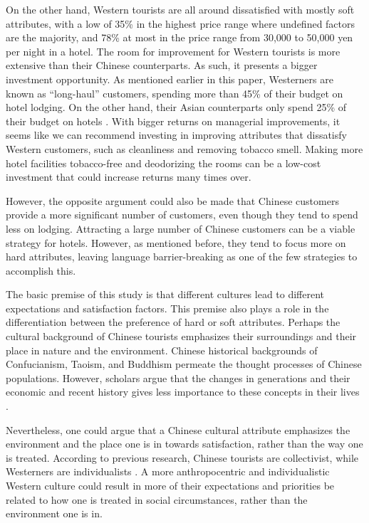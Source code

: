 \documentclass[smallextended,natbib]{svjour3}       %
\begin{document}
    On the other hand, Western tourists are all around dissatisfied with mostly soft attributes, with a low of 35\% in the highest price range where undefined factors are the majority, and 78\% at most in the price range from 30,000 to 50,000 yen per night in a hotel. The room for improvement for Western tourists is more extensive than their Chinese counterparts. As such, it presents a bigger investment opportunity. As mentioned earlier in this paper, Westerners are known as ``long-haul'' customers, spending more than 45\% of their budget on hotel lodging. On the other hand, their Asian counterparts only spend 25\% of their budget on hotels \cite[][]{choi2000}. With bigger returns on managerial improvements, it seems like we can recommend investing in improving attributes that dissatisfy Western customers, such as cleanliness and removing tobacco smell. Making more hotel facilities tobacco-free and deodorizing the rooms can be a low-cost investment that could increase returns many times over.

    However, the opposite argument could also be made that Chinese customers provide a more significant number of customers, even though they tend to spend less on lodging. Attracting a large number of Chinese customers can be a viable strategy for hotels. However, as mentioned before, they tend to focus more on hard attributes, leaving language barrier-breaking as one of the few strategies to accomplish this.

    The basic premise of this study is that different cultures lead to different expectations and satisfaction factors. This premise also plays a role in the differentiation between the preference of hard or soft attributes. Perhaps the cultural background of Chinese tourists emphasizes their surroundings and their place in nature and the environment. Chinese historical backgrounds of Confucianism, Taoism, and Buddhism permeate the thought processes of Chinese populations. However, scholars argue that the changes in generations and their economic and recent history gives less importance to these concepts in their lives \cite[][]{gao2017chinese}.

    Nevertheless, one could argue that a Chinese cultural attribute emphasizes the environment and the place one is in towards satisfaction, rather than the way one is treated. According to previous research, Chinese tourists are collectivist, while Westerners are individualists \cite[][]{kim2000}. A more anthropocentric and individualistic Western culture could result in more of their expectations and priorities be related to how one is treated in social circumstances, rather than the environment one is in.
\end{document}
